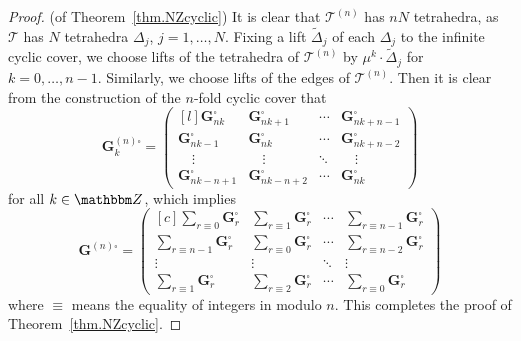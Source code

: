 \documentclass[12pt,reqno]{amsart}
\theoremstyle{definition}
\def\BZ{\mathbbm Z}
\def\calT{\mathcal T}
\def\ti{\widetilde}
\def\be{\begin{equation}}
\def\ee{\end{equation}}
\begin{document}
\begin{proof}(of Theorem~\ref{thm.NZcyclic})
It is clear that $\calT^{(n)}$ has $nN$ tetrahedra, as $\calT$ has $N$
tetrahedra  $\Delta_j$, $j=1,\ldots,N$. Fixing  a lift $\ti \Delta_j$ of
each $\Delta_j$ to the infinite cyclic cover, we choose lifts of
the tetrahedra of $\calT^{(n)}$ by  $\mu^k \cdot \ti \Delta_j$ for $k=0, \ldots, n-1$.
Similarly,  we choose lifts of the edges of $\calT^{(n)}$. Then 
 it is clear from the
construction of the $n$-fold cyclic cover that
\be
\label{Gnkt}
\mathbf{G}^{(n)\square}_k = 
\begin{pmatrix*}[l]
  \mathbf{G}^\square_{nk} &  \mathbf{G}^\square_{nk+1}& \cdots
  &  \mathbf{G}^\square_{nk+n-1}\\
  \mathbf{G}^\square_{nk-1} &  \mathbf{G}^\square_{nk}  & \cdots
  &  \mathbf{G}^\square_{nk+n-2}\\
\quad \vdots & \quad \vdots & \ddots & \quad \vdots \\
\mathbf{G}^\square_{nk-n+1} &  \mathbf{G}^\square_{nk-n+2}  & \cdots
&  \mathbf{G}^\square_{nk}
\end{pmatrix*} 
\ee	
for all $k \in \BZ$, which implies 
\be
\label{Gnt}
\mathbf{G}^{(n)\square} = 
\begin{pmatrix*}[c]
  \sum_{r \equiv 0} \mathbf{G}^\square_r & \sum_{r \equiv 1} \mathbf{G}^\square_r
  & \cdots & \sum_{r \equiv n-1} \mathbf{G}^\square_r\\
  \sum_{r \equiv n-1} \mathbf{G}^\square_r & \sum_{r \equiv 0} \mathbf{G}^\square_r
  & \cdots & \sum_{r \equiv n-2} \mathbf{G}^\square_r\\
  \vdots & \vdots & \ddots & \vdots \\
  \sum_{r \equiv 1} \mathbf{G}^\square_r & \sum_{r \equiv 2} \mathbf{G}^\square_r
  & \cdots & \sum_{r \equiv 0} \mathbf{G}^\square_r
\end{pmatrix*} 
\ee
where $\equiv$ means the equality of integers in modulo $n$. This 
completes the proof of Theorem~\ref{thm.NZcyclic}.
\end{proof}
\end{document}
